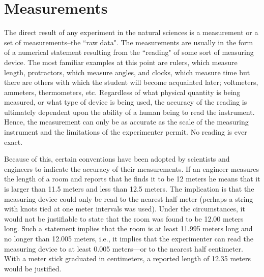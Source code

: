\documentclass[main.tex]{subfiles}
\begin{document}
\section{Measurements}\label{sec:Measurements}

The direct result of any experiment in the natural sciences is a measurement or a set of measurements--the ``raw data".  The measurements are usually in the form of a numerical statement resulting from the ``reading" of some sort of measuring device.  The most familiar examples at this point are rulers, which measure length, protractors, which measure angles, and clocks, which measure time but there are others with which the student will become acquainted later; voltmeters, ammeters, thermometers, etc.  Regardless of what physical quantity is being measured, or what type of device is being used, the accuracy of the reading is ultimately dependent upon the ability of a human being to read the instrument.  Hence, the measurement can only be as accurate as the scale of the measuring instrument and the limitations of the experimenter permit.  No reading is ever exact.

Because of this, certain conventions have been adopted by scientists and engineers to indicate the accuracy of their measurements.  If an engineer measures the length of a room and reports that he finds it to be 12 meters he means that it is larger than 11.5 meters and less than 12.5 meters.  The implication is that the measuring device could only be read to the nearest half meter (perhaps a string with knots tied at one meter intervals was used).  Under the circumstances, it would not be justifiable to state that the room was found to be 12.00 meters long.  Such a statement implies that the room is at least 11.995 meters long and no longer than 12.005 meters, i.e., it implies that the experimenter can read the measuring device to at least 0.005 meters---or to the nearest half centimeter.  With a meter stick graduated in centimeters, a reported length of 12.35 meters would be justified.
\end{document}
